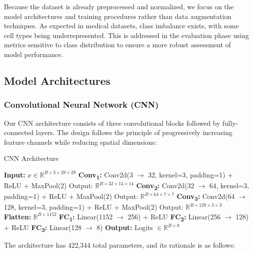 \documentclass[runningheads]{llncs}
\begin{document}
\noindent 
Because the dataset is already preprocessed and normalized, we focus on the model architectures and training procedures rather than data augmentation techniques.
As expected in medical datasets, class imbalance exists, with some cell types being underrepresented. 
This is addressed in the evaluation phase using metrics sensitive to class distribution
to ensure a more robust assessment of model performance.

\subsection{Model Architectures}

\subsubsection{Convolutional Neural Network (CNN)}
Our CNN architecture consists of three convolutional blocks followed by fully-connected layers. 
The design follows the principle of progressively increasing feature channels while reducing spatial dimensions:

\begin{algorithm}
\caption{CNN Architecture}
\begin{algorithmic}[1]
\STATE \textbf{Input:} $x \in \mathbb{R}^{B \times 3 \times 28 \times 28}$
\STATE \textbf{Conv\textsubscript{1}:} Conv2d(3 $\rightarrow$ 32, kernel=3, padding=1) + ReLU + MaxPool(2)
\STATE \quad Output: $\mathbb{R}^{B \times 32 \times 14 \times 14}$
\STATE \textbf{Conv\textsubscript{2}:} Conv2d(32 $\rightarrow$ 64, kernel=3, padding=1) + ReLU + MaxPool(2)
\STATE \quad Output: $\mathbb{R}^{B \times 64 \times 7 \times 7}$
\STATE \textbf{Conv\textsubscript{3}:} Conv2d(64 $\rightarrow$ 128, kernel=3, padding=1) + ReLU + MaxPool(2)
\STATE \quad Output: $\mathbb{R}^{B \times 128 \times 3 \times 3}$
\STATE \textbf{Flatten:} $\mathbb{R}^{B \times 1152}$
\STATE \textbf{FC\textsubscript{1}:} Linear(1152 $\rightarrow$ 256) + ReLU
\STATE \textbf{FC\textsubscript{2}:} Linear(256 $\rightarrow$ 128) + ReLU
\STATE \textbf{FC\textsubscript{3}:} Linear(128 $\rightarrow$ 8)
\STATE \textbf{Output:} Logits $\in \mathbb{R}^{B \times 8}$
\end{algorithmic}
\end{algorithm}

\noindent 
The architecture has 422,344 total parameters, and its rationale is as follows:
\end{document}
